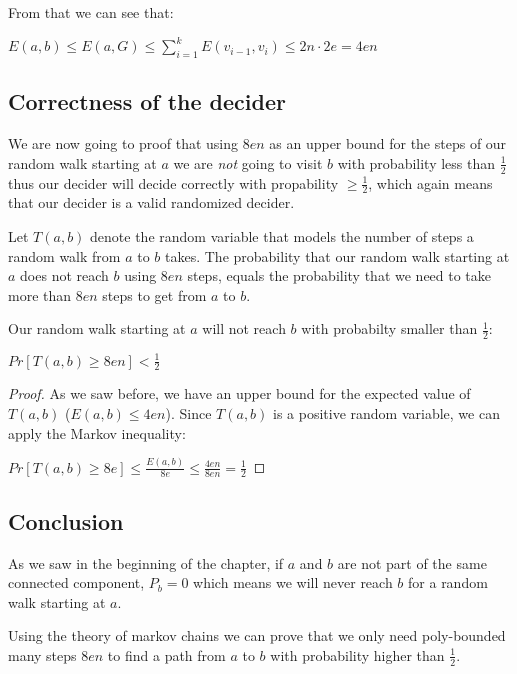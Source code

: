 From that we can see that:

$E(a, b) \leq E(a, G) \leq \sum_{i=1}^{k} E(v_{i-1}, v_i) \leq 2n \cdot 2e = 4en$

\subsection{Correctness of the
decider}\label{correctness-of-the-decider}

We are now going to proof that using $8en$ as an upper bound for the
steps of our random walk starting at $a$ we are \emph{not} going to
visit $b$ with probability less than $\frac{1}{2}$ thus our decider will
decide correctly with propability $\geq \frac{1}{2}$, which again means
that our decider is a valid randomized decider.

Let $T(a, b)$ denote the random variable that models the number of steps
a random walk from $a$ to $b$ takes. The probability that our random
walk starting at $a$ does not reach $b$ using $8en$ steps, equals the
probability that we need to take more than $8en$ steps to get from $a$
to $b$.

\vspace{0.5cm}

\begin{thm}
Our random walk starting at $a$ will not reach $b$ with probabilty smaller than $\frac{1}{2}$:

$Pr[T(a, b) \geq 8en] < \frac{1}{2}$
\end{thm}

\begin{proof}

As we saw before, we have an upper bound for the expected value of $T(a, b)$ ($E(a, b) \leq 4en$).
Since $T(a, b)$ is a positive random variable, we can apply the Markov inequality:

$Pr[T(a, b) \geq 8e] \leq \frac{E(a, b)}{8e} \leq \frac{4en}{8en} = \frac{1}{2}$
\end{proof}

\subsection{Conclusion}\label{conclusion}

As we saw in the beginning of the chapter, if $a$ and $b$ are not part
of the same connected component, $P_b = 0$ which means we will never
reach $b$ for a random walk starting at $a$.

Using the theory of markov chains we can prove that we only need
poly-bounded many steps $8en$ to find a path from $a$ to $b$ with
probability higher than $\frac{1}{2}$.

